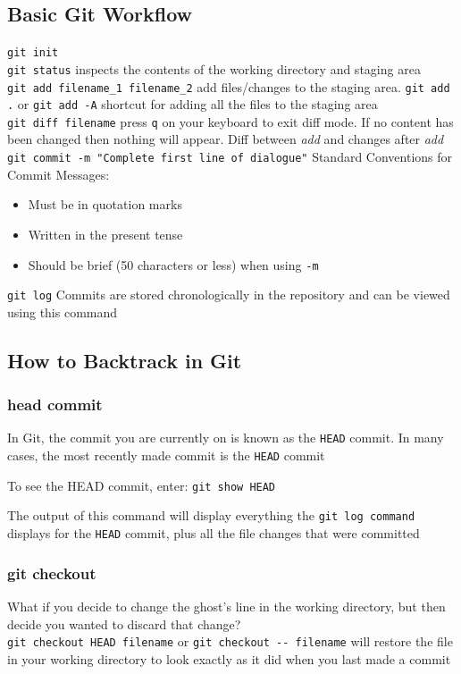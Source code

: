 \documentclass[a4paper, 12pt]{article}
\begin{document}
\subsection{Basic Git Workflow}
\noindent\verb|git init|\\
\verb|git status| inspects the contents of the working directory and staging area\\
\verb|git add filename_1 filename_2| add files/changes to the staging area. \verb|git add .| or \verb|git add -A| shortcut for adding all the files to the staging area \\
\verb|git diff filename| press \verb|q| on your keyboard to exit diff mode. If no content has been changed then nothing will appear. Diff between \textit{add} and changes after \textit{add} \\ 
\verb|git commit -m "Complete first line of dialogue"| Standard Conventions for Commit Messages:
\begin{itemize}
\item Must be in quotation marks
\item Written in the present tense
\item Should be brief (50 characters or less) when using \verb|-m|
\end{itemize}
\verb|git log| Commits are stored chronologically in the repository and can be viewed using this command

\subsection{How to Backtrack in Git}
\subsubsection{head commit}
In Git, the commit you are currently on is known as the \verb|HEAD| commit. In many cases, the most recently made commit is the \verb|HEAD| commit

To see the HEAD commit, enter: \verb|git show HEAD|

The output of this command will display everything the \verb|git log command| displays for the \verb|HEAD| commit, plus all the file changes that were committed

\subsubsection{git checkout}
What if you decide to change the ghost's line in the working directory, but then decide you wanted to discard that change?\\
\verb|git checkout HEAD filename| or \verb|git checkout -- filename| will restore the file in your working directory to look exactly as it did when you last made a commit
\end{document}
